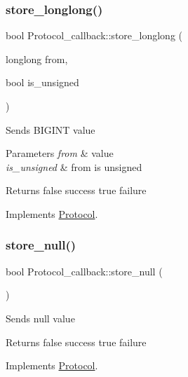 \subsubsection{\texorpdfstring{store\+\_\+longlong()}{store\_longlong()}}
{\footnotesize\ttfamily bool Protocol\+\_\+callback\+::store\+\_\+longlong (\begin{DoxyParamCaption}\item[{longlong}]{from,  }\item[{bool}]{is\+\_\+unsigned }\end{DoxyParamCaption})\hspace{0.3cm}{\ttfamily [virtual]}}

Sends B\+I\+G\+I\+NT value


\begin{DoxyParams}{Parameters}
{\em from} & value \\
\hline
{\em is\+\_\+unsigned} & from is unsigned\\
\hline
\end{DoxyParams}
\begin{DoxyReturn}{Returns}
false success true failure 
\end{DoxyReturn}


Implements \mbox{\hyperlink{classProtocol}{Protocol}}.

\mbox{\label{classProtocol__callback_a25f50034be8c1d9991c8794acb04c6d7}} 
\subsubsection{\texorpdfstring{store\+\_\+null()}{store\_null()}}
{\footnotesize\ttfamily bool Protocol\+\_\+callback\+::store\+\_\+null (\begin{DoxyParamCaption}{ }\end{DoxyParamCaption})\hspace{0.3cm}{\ttfamily [virtual]}}

Sends null value

\begin{DoxyReturn}{Returns}
false success true failure 
\end{DoxyReturn}


Implements \mbox{\hyperlink{classProtocol}{Protocol}}.

\mbox{\label{classProtocol__callback_ad456eec2e3012513ed0291d99e5d9831}} 
